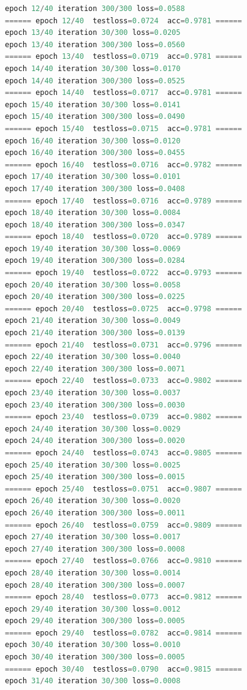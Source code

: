 \documentclass[UTF-8]{progbookcn}
\begin{document}
\begin{lstlisting}[language=C,caption={输出代码}]
epoch 12/40 iteration 300/300 loss=0.0588
====== epoch 12/40  testloss=0.0724  acc=0.9781 ======
epoch 13/40 iteration 30/300 loss=0.0205
epoch 13/40 iteration 300/300 loss=0.0560
====== epoch 13/40  testloss=0.0719  acc=0.9781 ======
epoch 14/40 iteration 30/300 loss=0.0170
epoch 14/40 iteration 300/300 loss=0.0525
====== epoch 14/40  testloss=0.0717  acc=0.9781 ======
epoch 15/40 iteration 30/300 loss=0.0141
epoch 15/40 iteration 300/300 loss=0.0490
====== epoch 15/40  testloss=0.0715  acc=0.9781 ======
epoch 16/40 iteration 30/300 loss=0.0120
epoch 16/40 iteration 300/300 loss=0.0455
====== epoch 16/40  testloss=0.0716  acc=0.9782 ======
epoch 17/40 iteration 30/300 loss=0.0101
epoch 17/40 iteration 300/300 loss=0.0408
====== epoch 17/40  testloss=0.0716  acc=0.9789 ======
epoch 18/40 iteration 30/300 loss=0.0084
epoch 18/40 iteration 300/300 loss=0.0347
====== epoch 18/40  testloss=0.0720  acc=0.9789 ======
epoch 19/40 iteration 30/300 loss=0.0069
epoch 19/40 iteration 300/300 loss=0.0284
====== epoch 19/40  testloss=0.0722  acc=0.9793 ======
epoch 20/40 iteration 30/300 loss=0.0058
epoch 20/40 iteration 300/300 loss=0.0225
====== epoch 20/40  testloss=0.0725  acc=0.9798 ======
epoch 21/40 iteration 30/300 loss=0.0049
epoch 21/40 iteration 300/300 loss=0.0139
====== epoch 21/40  testloss=0.0731  acc=0.9796 ======
epoch 22/40 iteration 30/300 loss=0.0040
epoch 22/40 iteration 300/300 loss=0.0071
====== epoch 22/40  testloss=0.0733  acc=0.9802 ======
epoch 23/40 iteration 30/300 loss=0.0037
epoch 23/40 iteration 300/300 loss=0.0030
====== epoch 23/40  testloss=0.0739  acc=0.9802 ======
epoch 24/40 iteration 30/300 loss=0.0029
epoch 24/40 iteration 300/300 loss=0.0020
====== epoch 24/40  testloss=0.0743  acc=0.9805 ======
epoch 25/40 iteration 30/300 loss=0.0025
epoch 25/40 iteration 300/300 loss=0.0015
====== epoch 25/40  testloss=0.0751  acc=0.9807 ======
epoch 26/40 iteration 30/300 loss=0.0020
epoch 26/40 iteration 300/300 loss=0.0011
====== epoch 26/40  testloss=0.0759  acc=0.9809 ======
epoch 27/40 iteration 30/300 loss=0.0017
epoch 27/40 iteration 300/300 loss=0.0008
====== epoch 27/40  testloss=0.0766  acc=0.9810 ======
epoch 28/40 iteration 30/300 loss=0.0014
epoch 28/40 iteration 300/300 loss=0.0007
====== epoch 28/40  testloss=0.0773  acc=0.9812 ======
epoch 29/40 iteration 30/300 loss=0.0012
epoch 29/40 iteration 300/300 loss=0.0005
====== epoch 29/40  testloss=0.0782  acc=0.9814 ======
epoch 30/40 iteration 30/300 loss=0.0010
epoch 30/40 iteration 300/300 loss=0.0005
====== epoch 30/40  testloss=0.0790  acc=0.9815 ======
epoch 31/40 iteration 30/300 loss=0.0008

\end{lstlisting}
\end{document}

